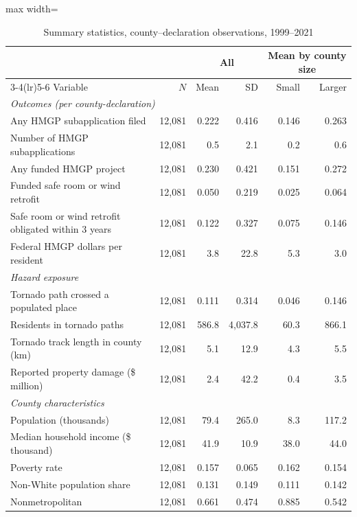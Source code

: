\begin{table}[!htbp]
\centering
\caption{Summary statistics, county--declaration observations, 1999--2021}
\label{tab:summary}
\footnotesize
\begin{adjustbox}{max width=\linewidth}
\begin{tabular}{@{}lrrrrr@{}}
\toprule
 & & \multicolumn{2}{c}{All} & \multicolumn{2}{c}{Mean by county size} \\
\cmidrule(lr){3-4}\cmidrule(lr){5-6}
Variable & $N$ & Mean & SD & Small & Larger \\
\midrule
\multicolumn{6}{l}{\textit{Outcomes (per county-declaration)}} \\
\quad Any HMGP subapplication filed & 12,081 & 0.222 & 0.416 & 0.146 & 0.263 \\
\quad Number of HMGP subapplications & 12,081 & 0.5 & 2.1 & 0.2 & 0.6 \\
\quad Any funded HMGP project & 12,081 & 0.230 & 0.421 & 0.151 & 0.272 \\
\quad Funded safe room or wind retrofit & 12,081 & 0.050 & 0.219 & 0.025 & 0.064 \\
\quad Safe room or wind retrofit obligated within 3 years & 12,081 & 0.122 & 0.327 & 0.075 & 0.146 \\
\quad Federal HMGP dollars per resident & 12,081 & 3.8 & 22.8 & 5.3 & 3.0 \\
\multicolumn{6}{l}{\textit{Hazard exposure}} \\
\quad Tornado path crossed a populated place & 12,081 & 0.111 & 0.314 & 0.046 & 0.146 \\
\quad Residents in tornado paths & 12,081 & 586.8 & 4,037.8 & 60.3 & 866.1 \\
\quad Tornado track length in county (km) & 12,081 & 5.1 & 12.9 & 4.3 & 5.5 \\
\quad Reported property damage (\$ million) & 12,081 & 2.4 & 42.2 & 0.4 & 3.5 \\
\multicolumn{6}{l}{\textit{County characteristics}} \\
\quad Population (thousands) & 12,081 & 79.4 & 265.0 & 8.3 & 117.2 \\
\quad Median household income (\$ thousand) & 12,081 & 41.9 & 10.9 & 38.0 & 44.0 \\
\quad Poverty rate & 12,081 & 0.157 & 0.065 & 0.162 & 0.154 \\
\quad Non-White population share & 12,081 & 0.131 & 0.149 & 0.111 & 0.142 \\
\quad Nonmetropolitan & 12,081 & 0.661 & 0.474 & 0.885 & 0.542 \\

\end{tabular}
\end{adjustbox}
\end{table}
